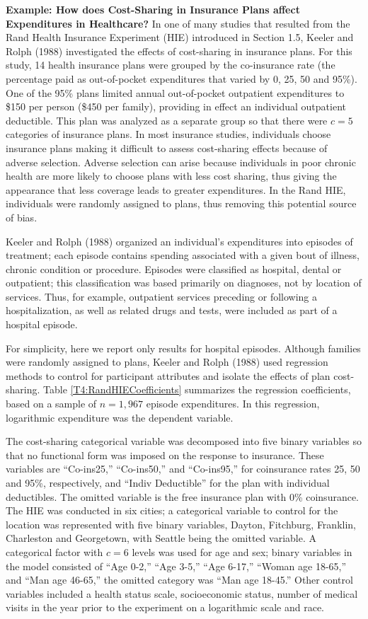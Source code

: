 \linejed

\textbf{Example: How does Cost-Sharing in Insurance Plans affect
Expenditures in Healthcare?} In one of many studies that resulted
from the Rand Health Insurance Experiment (HIE) introduced in
Section 1.5, Keeler and Rolph (1988) investigated the effects of
cost-sharing in insurance plans. For this study, 14 health insurance
plans were grouped by the co-insurance rate (the percentage paid as
out-of-pocket expenditures that varied by 0, 25, 50 and 95\%). One
of the 95\% plans limited annual out-of-pocket outpatient
expenditures to \$150 per person (\$450 per family), providing in
effect an individual outpatient deductible. This plan was analyzed
as a separate group so that there were $c=5$ categories of insurance
plans. In most insurance studies, individuals choose insurance plans
making it difficult to assess cost-sharing effects because of
adverse selection. Adverse selection can arise because individuals
in poor chronic health are more likely to choose plans with less
cost sharing, thus giving the appearance that less coverage leads to
greater expenditures. In the Rand HIE, individuals were randomly
assigned to plans, thus removing this potential source of bias.

Keeler and Rolph (1988) organized an individual's expenditures into
episodes of treatment; each episode contains spending associated
with a given bout of illness, chronic condition or procedure.
Episodes were classified as hospital, dental or outpatient; this
classification was based primarily on diagnoses, not by location of
services. Thus, for example, outpatient services preceding or
following a hospitalization, as well as related drugs and tests,
were included as part of a hospital episode.

For simplicity, here we report only results for hospital episodes.
Although families were randomly assigned to plans, Keeler and Rolph
(1988) used regression methods to control for participant attributes
and isolate the effects of plan cost-sharing. Table
\ref{T4:RandHIECoefficients} summarizes the regression coefficients,
based on a sample of $n=1,967$ episode expenditures. In this
regression, logarithmic expenditure was the dependent variable.

The cost-sharing categorical variable was decomposed into five
binary variables so that no functional form was imposed on the
response to insurance. These variables are ``Co-ins25,''
``Co-ins50,'' and ``Co-ins95,'' for coinsurance rates 25, 50 and
95\%, respectively, and ``Indiv Deductible'' for the plan with
individual deductibles. The omitted variable is the free insurance
plan with 0\% coinsurance. The HIE was conducted in six cities; a
categorical variable to control for the location was represented
with five binary variables, Dayton, Fitchburg, Franklin, Charleston
and Georgetown, with Seattle being the omitted variable. A
categorical factor with $c=6$ levels was used for age and sex;
binary variables in the model consisted of ``Age 0-2,'' ``Age 3-5,''
``Age 6-17,'' ``Woman age 18-65,'' and ``Man age 46-65,'' the
omitted category was ``Man age 18-45.'' Other control variables
included a health status scale, socioeconomic status, number of
medical visits in the year prior to the experiment on a logarithmic
scale and race.

